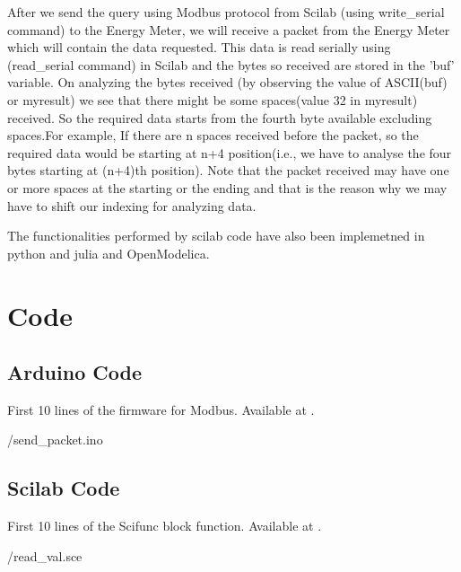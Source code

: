 After we send the query using Modbus protocol from Scilab (using
write\_serial command) to the Energy Meter, we will receive a packet
from the Energy Meter which will contain the data requested. This data
is read serially using (read\_serial command) in Scilab and the bytes
so received are stored in the 'buf' variable. On analyzing the bytes
received (by observing the value of ASCII(buf) or myresult) we see
that there might be some spaces(value 32 in myresult) received. So the
required data starts from the fourth byte available excluding
spaces.For example, If there are n spaces received before the packet,
so the required data would be starting at n+4 position(i.e., we have
to analyse the four bytes starting at (n+4)th position). Note that the
packet received may have one or more spaces at the starting or the
ending and that is the reason why we may have to shift our indexing
for analyzing data.

The functionalities performed by scilab code have also been implemetned in 
python and julia and OpenModelica.

\section{Code}
\subsection{Arduino Code}
\label{sec:firmware-modbus}

\begin{ardcode}
{First 10 lines of the firmware for Modbus.  Available at
  .}
\label{ard:firmware-modbus}

{\LocMODardcode/send_packet.ino}
\end{ardcode}

\subsection{Scilab Code}
\label{sec:modbus-scilab-code}

\begin{scicode}
{First 10 lines of the Scifunc block function.  Available at
  .} 
\label{sci:current-modbus}

{\LocMODscicode/read_val.sce}
\end{scicode}

